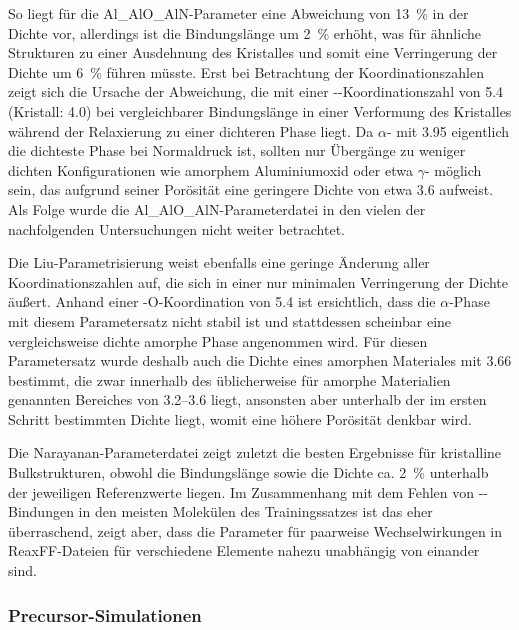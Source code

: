 So liegt für die Al\_AlO\_AlN-Parameter eine Abweichung von \SI{+13}{\percent} in der Dichte vor, allerdings ist die Bindungslänge um \SI{2}{\percent} erhöht, was für ähnliche Strukturen zu einer Ausdehnung des Kristalles und somit eine Verringerung der Dichte um \SI{6}{\percent} führen müsste.
Erst bei Betrachtung der Koordinationszahlen zeigt sich die Ursache der Abweichung, die mit einer --Koordinationszahl von \num{5.4} (Kristall: \num{4.0}) bei vergleichbarer Bindungslänge in einer Verformung des Kristalles während der Relaxierung zu einer dichteren Phase liegt.
Da $\alpha$- mit \SI{3.95}{\gpcc} eigentlich die dichteste Phase bei Normaldruck ist, sollten nur Übergänge zu weniger dichten Konfigurationen wie amorphem Aluminiumoxid oder etwa $\gamma$- möglich sein, das aufgrund seiner Porösität eine geringere Dichte von etwa \SI{3.6}{\gpcc} aufweist.
Als Folge wurde die Al\_AlO\_AlN-Parameterdatei in den vielen der nachfolgenden Untersuchungen nicht weiter betrachtet.

Die Liu-Parametrisierung weist ebenfalls eine geringe Änderung aller Koordinationszahlen auf, die sich in einer nur minimalen Verringerung der Dichte äußert.
Anhand einer -{O}-Koordination von \num{5.4} ist ersichtlich, dass die $\alpha$-Phase mit diesem Parametersatz nicht stabil ist und stattdessen scheinbar eine vergleichsweise dichte amorphe Phase angenommen wird.
Für diesen Parametersatz wurde deshalb auch die Dichte eines amorphen Materiales mit \SI{3.66}{\gpcc} bestimmt, die zwar innerhalb des üblicherweise für amorphe Materialien genannten Bereiches von \SIrange{3.2}{3.6}{\gpcc} liegt, ansonsten aber unterhalb der im ersten Schritt bestimmten Dichte liegt, womit eine höhere Porösität denkbar wird.

Die Narayanan-Parameterdatei zeigt zuletzt die besten Ergebnisse für kristalline Bulkstrukturen, obwohl die Bindungslänge sowie die Dichte ca. \SI{2}{\percent} unterhalb der jeweiligen Referenzwerte liegen.
Im Zusammenhang mit dem Fehlen von --Bindungen in den meisten Molekülen des Trainingssatzes ist das eher überraschend, zeigt aber, dass die Parameter für paarweise Wechselwirkungen in ReaxFF-Dateien für verschiedene Elemente nahezu unabhängig von einander sind.

\subsubsection{Precursor-Simulationen}

